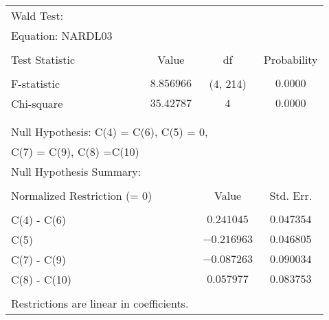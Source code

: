 \begin{tabular}{lrrr}
\multicolumn{1}{l}{Wald Test:}&\multicolumn{1}{c}{}&\multicolumn{1}{c}{}&\multicolumn{1}{c}{}\\
\multicolumn{2}{l}{Equation: NARDL03}&\multicolumn{1}{c}{}&\multicolumn{1}{c}{}\\
[4.5pt] \hline \\ [-4.5pt]
\multicolumn{1}{l}{Test Statistic}&\multicolumn{1}{c}{Value}&\multicolumn{1}{c}{df}&\multicolumn{1}{c}{Probability}\\
[4.5pt] \hline \\ [-4.5pt]
\multicolumn{1}{l}{F-statistic}&\multicolumn{1}{c}{$8.856966$}&\multicolumn{1}{c}{(4, 214)}&\multicolumn{1}{c}{$0.0000$}\\
\multicolumn{1}{l}{Chi-square}&\multicolumn{1}{c}{$35.42787$}&\multicolumn{1}{c}{$4$}&\multicolumn{1}{c}{$0.0000$}\\
[4.5pt] \hline \\ [-4.5pt]
\multicolumn{1}{c}{}&\multicolumn{1}{c}{}&\multicolumn{1}{c}{}&\multicolumn{1}{c}{}\\
\multicolumn{5}{l}{Null Hypothesis: C(4) = C(6), C(5) = 0,}\\
\multicolumn{1}{l}{C(7) = C(9), C(8) =C(10)}&\multicolumn{1}{c}{}&\multicolumn{1}{c}{}&\multicolumn{1}{c}{}\\
\multicolumn{2}{l}{Null Hypothesis Summary:}&\multicolumn{1}{c}{}&\multicolumn{1}{c}{}\\
[4.5pt] \hline \\ [-4.5pt]
\multicolumn{2}{l}{Normalized Restriction (= 0)}&\multicolumn{1}{c}{Value}&\multicolumn{1}{c}{Std. Err.}\\
[4.5pt] \hline \\ [-4.5pt]
\multicolumn{1}{l}{C(4) - C(6)}&\multicolumn{1}{c}{}&\multicolumn{1}{c}{$0.241045$}&\multicolumn{1}{c}{$0.047354$}\\
\multicolumn{1}{l}{C(5)}&\multicolumn{1}{c}{}&\multicolumn{1}{c}{$-0.216963$}&\multicolumn{1}{c}{$0.046805$}\\
\multicolumn{1}{l}{C(7) - C(9)}&\multicolumn{1}{c}{}&\multicolumn{1}{c}{$-0.087263$}&\multicolumn{1}{c}{$0.090034$}\\
\multicolumn{1}{l}{C(8) - C(10)}&\multicolumn{1}{c}{}&\multicolumn{1}{c}{$0.057977$}&\multicolumn{1}{c}{$0.083753$}\\
[4.5pt] \hline \\ [-4.5pt]
\multicolumn{3}{l}{Restrictions are linear in coefficients.}&\multicolumn{1}{c}{}\\
\end{tabular}